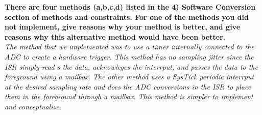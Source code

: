 \documentclass[twoside]{article}
\begin{document}
\begin{pset}
  \textbf{There are four methods (a,b,c,d) listed in the 4) Software Conversion section of methods and constraints. For one of the methods you did not implement, give reasons why your method is better, and give reasons why this alternative method would have been better. }\\
	\emph{The method that we implemented was to use a timer internally connected to the ADC to create a hardware trigger. This method has no sampling jitter since the ISR simply read s the data, acknowleges the interrput, and passes the data to the foreground using a mailbox. The other method uses a SysTick periodic interrput at the desired sampling rate and does the ADC conversions in the ISR to place them in the foreground through a mailbox. This method is simpler to implement and conceptualize.}
\end{pset}
\end{document}
